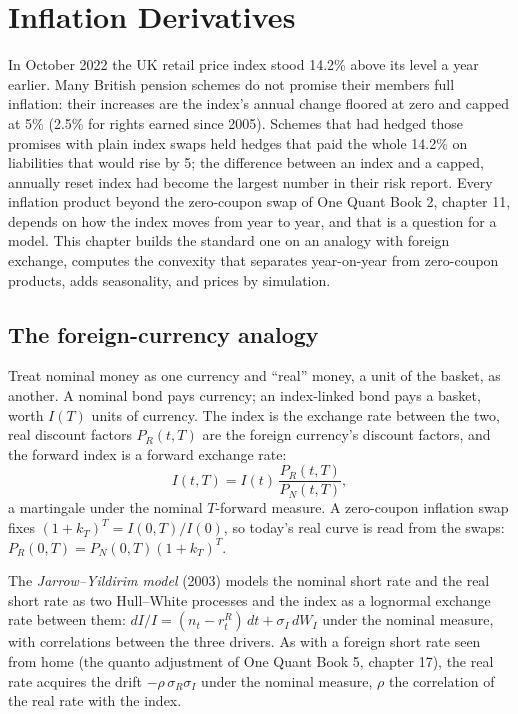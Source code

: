 \chapter{Inflation Derivatives}\label{ch:rc:inflation-derivatives}

In October 2022 the UK retail price index stood 14.2\% above its level a year
earlier. Many British pension schemes do not promise their members full
inflation: their increases are the index's annual change floored at zero and
capped at 5\% (2.5\% for rights earned since 2005). Schemes that had hedged those
promises with plain index swaps held hedges that paid the whole 14.2\% on
liabilities that would rise by 5; the difference between an index and a capped,
annually reset index had become the largest number in their risk report. Every
inflation product beyond the zero-coupon swap of One Quant Book 2, chapter 11,
depends on how the index moves from year to year, and that is a question for a
model. This chapter builds the standard one on an analogy with foreign exchange,
computes the convexity that separates year-on-year from zero-coupon products,
adds seasonality, and prices  by simulation.

\section{The foreign-currency analogy}

Treat nominal money as one currency and ``real'' money, a unit of the basket,
as another. A nominal bond pays currency; an index-linked bond pays a basket, worth
$I(T)$ units of currency. The index is the exchange rate between the two, real
discount factors $P_R(t,T)$ are the foreign currency's discount factors, and the
forward index is a forward exchange rate:
\[
I(t,T) = I(t)\,\frac{P_R(t,T)}{P_N(t,T)},
\]
a martingale under the nominal $T$-forward measure. A zero-coupon inflation swap
fixes $(1+k_T)^T = I(0,T)/I(0)$, so today's real curve is read from the swaps:
$P_R(0,T) = P_N(0,T)(1+k_T)^T$.

\begin{definition}\label{def:rc:inflation-derivatives:jy}
The \emph{Jarrow--Yildirim model} (2003) models the
nominal short rate and the real short rate as two Hull--White processes and the
index as a lognormal exchange rate between them:
$dI/I = (n_t-r^R_t)\,dt+\sigma_I\,dW_I$ under the nominal measure, with correlations
between the three drivers. As with a foreign short rate seen from home (the quanto
adjustment of One Quant Book 5, chapter 17), the real rate acquires the drift
$-\rho\,\sigma_R\sigma_I$ under the nominal measure, $\rho$ the correlation of the real
rate with the index.
\end{definition}

